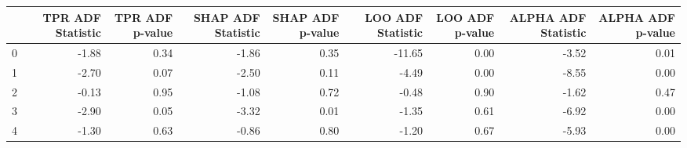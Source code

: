 \begin{tabular}{lrrrrrrrr}
\toprule
 & TPR ADF Statistic & TPR ADF p-value & SHAP ADF Statistic & SHAP ADF p-value & LOO ADF Statistic & LOO ADF p-value & ALPHA ADF Statistic & ALPHA ADF p-value \\
\midrule
0 & -1.88 & 0.34 & -1.86 & 0.35 & -11.65 & 0.00 & -3.52 & 0.01 \\
1 & -2.70 & 0.07 & -2.50 & 0.11 & -4.49 & 0.00 & -8.55 & 0.00 \\
2 & -0.13 & 0.95 & -1.08 & 0.72 & -0.48 & 0.90 & -1.62 & 0.47 \\
3 & -2.90 & 0.05 & -3.32 & 0.01 & -1.35 & 0.61 & -6.92 & 0.00 \\
4 & -1.30 & 0.63 & -0.86 & 0.80 & -1.20 & 0.67 & -5.93 & 0.00 \\
\bottomrule
\end{tabular}
